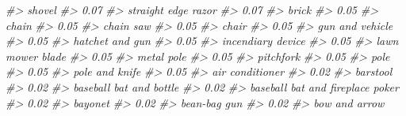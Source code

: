 \documentclass[
]{krantz}
\makeatletter
\newenvironment{Shaded}{\begin{snugshade}}{\end{snugshade}}
\newcommand{\CommentTok}[1]{\textcolor[rgb]{0.37,0.37,0.37}{\textit{#1}}}
\newenvironment{kframe}{%
\medskip{}
\setlength{\fboxsep}{.8em}
 \def\at@end@of@kframe{}%
 \ifinner\ifhmode%
  \def\at@end@of@kframe{\end{minipage}}%
  \begin{minipage}{\columnwidth}%
 \fi\fi%
 \def\FrameCommand##1{\hskip\@totalleftmargin \hskip-\fboxsep
 \colorbox{shadecolor}{##1}\hskip-\fboxsep
     \hskip-\linewidth \hskip-\@totalleftmargin \hskip\columnwidth}%
 \MakeFramed {\advance\hsize-\width
   \@totalleftmargin\z@ \linewidth\hsize
   \@setminipage}}%
 {\par\unskip\endMakeFramed%
 \at@end@of@kframe}
\renewenvironment{Shaded}{\begin{kframe}}{\end{kframe}}
\makeatother
\begin{document}
\begin{Shaded}
\begin{Highlighting}[]
\CommentTok{\#\textgreater{}                           shovel }
\CommentTok{\#\textgreater{}                             0.07 }
\CommentTok{\#\textgreater{}              straight edge razor }
\CommentTok{\#\textgreater{}                             0.07 }
\CommentTok{\#\textgreater{}                            brick }
\CommentTok{\#\textgreater{}                             0.05 }
\CommentTok{\#\textgreater{}                            chain }
\CommentTok{\#\textgreater{}                             0.05 }
\CommentTok{\#\textgreater{}                        chain saw }
\CommentTok{\#\textgreater{}                             0.05 }
\CommentTok{\#\textgreater{}                            chair }
\CommentTok{\#\textgreater{}                             0.05 }
\CommentTok{\#\textgreater{}                  gun and vehicle }
\CommentTok{\#\textgreater{}                             0.05 }
\CommentTok{\#\textgreater{}                  hatchet and gun }
\CommentTok{\#\textgreater{}                             0.05 }
\CommentTok{\#\textgreater{}                incendiary device }
\CommentTok{\#\textgreater{}                             0.05 }
\CommentTok{\#\textgreater{}                 lawn mower blade }
\CommentTok{\#\textgreater{}                             0.05 }
\CommentTok{\#\textgreater{}                       metal pole }
\CommentTok{\#\textgreater{}                             0.05 }
\CommentTok{\#\textgreater{}                        pitchfork }
\CommentTok{\#\textgreater{}                             0.05 }
\CommentTok{\#\textgreater{}                             pole }
\CommentTok{\#\textgreater{}                             0.05 }
\CommentTok{\#\textgreater{}                   pole and knife }
\CommentTok{\#\textgreater{}                             0.05 }
\CommentTok{\#\textgreater{}                  air conditioner }
\CommentTok{\#\textgreater{}                             0.02 }
\CommentTok{\#\textgreater{}                         barstool }
\CommentTok{\#\textgreater{}                             0.02 }
\CommentTok{\#\textgreater{}          baseball bat and bottle }
\CommentTok{\#\textgreater{}                             0.02 }
\CommentTok{\#\textgreater{} baseball bat and fireplace poker }
\CommentTok{\#\textgreater{}                             0.02 }
\CommentTok{\#\textgreater{}                          bayonet }
\CommentTok{\#\textgreater{}                             0.02 }
\CommentTok{\#\textgreater{}                     bean{-}bag gun }
\CommentTok{\#\textgreater{}                             0.02 }
\CommentTok{\#\textgreater{}                    bow and arrow }

\end{Highlighting}
\end{Shaded}
\end{document}
